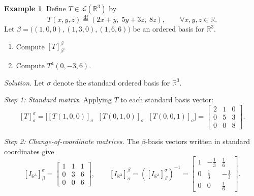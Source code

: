\documentclass[11pt, a4paper, notitlepage]{report}
\theoremstyle{definition}
\newtheorem{example}[theorem]{Example}
\theoremstyle{remark}
\begin{document}
\begin{example}
\label{ex:change-coord-R3-T4}
Define $T \in \mathcal{L}(\mathbb{R}^3)$ by
\[
  T(x,y,z) \stackrel{\mathrm{df}}{=} (2x+y,\;5y+3z,\;8z),
  \qquad \forall x,y,z\in\mathbb{R}.
\]
Let $\beta = \bigl((1,0,0),(1,3,0),(1,6,6)\bigr)$ be an ordered basis for $\mathbb{R}^3$.
\begin{enumerate}
  \item Compute $[T]_\beta^\beta$.
  \item Compute $T^4(0,-3,6)$.
\end{enumerate}

\emph{Solution.}  Let $\sigma$ denote the standard ordered basis for $\mathbb{R}^3$.

\emph{Step 1: Standard matrix.}  Applying $T$ to each standard basis vector:
\[
  [T]_\sigma^\sigma
  = \bigl[[T(1,0,0)]_\sigma \;\; [T(0,1,0)]_\sigma \;\; [T(0,0,1)]_\sigma\bigr]
  = \begin{bmatrix} 2 & 1 & 0 \\ 0 & 5 & 3 \\ 0 & 0 & 8 \end{bmatrix}.
\]

\emph{Step 2: Change-of-coordinate matrices.}  The $\beta$-basis vectors written in
standard coordinates give
\[
  [I_{\mathbb{R}^3}]_\beta^\sigma
  = \begin{bmatrix} 1 & 1 & 1 \\ 0 & 3 & 6 \\ 0 & 0 & 6 \end{bmatrix},
  \qquad
  [I_{\mathbb{R}^3}]_\sigma^\beta
  = \left([I_{\mathbb{R}^3}]_\beta^\sigma\right)^{-1}
  = \begin{bmatrix} 1 & -\tfrac{1}{3} & \tfrac{1}{6} \\ 0 & \tfrac{1}{3} & -\tfrac{1}{3} \\ 0 & 0 & \tfrac{1}{6} \end{bmatrix}.
\]


\end{example}
\end{document}
